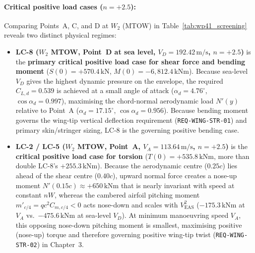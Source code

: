\paragraph{Critical positive load cases ($n = +2.5$):}
Comparing Points~A, C, and D at $W_2$ (MTOW) in Table~\ref{tab:wp41_screening} reveals two distinct physical regimes:
\begin{itemize}
    \item \textbf{LC-8 ($W_2$ MTOW, Point~D at sea level, $V_D = 192.42\,\text{m/s}$, $n = +2.5$)} is the \textbf{primary critical positive load case for shear force and bending moment} ($S(0) = +570.4\,\text{kN}$, $M(0) = -6{,}812.4\,\text{kNm}$). Because sea-level $V_D$ gives the highest dynamic pressure on the envelope, the required $C_{L,d} = 0.539$ is achieved at a small angle of attack ($\alpha_d = 4.76^\circ$, $\cos\alpha_d = 0.997$), maximising the chord-normal aerodynamic load $N'(y)$ relative to Point~A ($\alpha_d = 17.15^\circ$, $\cos\alpha_d = 0.956$). Because bending moment governs the wing-tip vertical deflection requirement (\texttt{REQ-WING-STR-01}) and primary skin/stringer sizing, LC-8 is the governing positive bending case.
    \item \textbf{LC-2 / LC-5 ($W_2$ MTOW, Point~A, $V_A = 113.64\,\text{m/s}$, $n = +2.5$)} is the \textbf{critical positive load case for torsion} ($T(0) = +535.8\,\text{kNm}$, more than double LC-8's $+255.3\,\text{kNm}$). Because the aerodynamic centre ($0.25c$) lies ahead of the shear centre ($0.40c$), upward normal force creates a nose-up moment $N'(0.15c) \approx +650\,\text{kNm}$ that is nearly invariant with speed at constant $nW$, whereas the cambered airfoil pitching moment $m'_{c/4} = q c^2 C_{m,c/4} < 0$ acts nose-down and scales with $V_{\mathrm{EAS}}^2$ ($-175.3\,\text{kNm}$ at $V_A$ vs.\ $-475.6\,\text{kNm}$ at sea-level $V_D$). At minimum manoeuvring speed $V_A$, this opposing nose-down pitching moment is smallest, maximising positive (nose-up) torque and therefore governing positive wing-tip twist (\texttt{REQ-WING-STR-02}) in Chapter~3.
\end{itemize}

